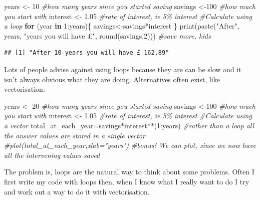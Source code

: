 \documentclass[
]{book}
\newenvironment{Shaded}{\begin{snugshade}}{\end{snugshade}}
\newcommand{\CommentTok}[1]{\textcolor[rgb]{0.56,0.35,0.01}{\textit{#1}}}
\newcommand{\ControlFlowTok}[1]{\textcolor[rgb]{0.13,0.29,0.53}{\textbf{#1}}}
\newcommand{\DecValTok}[1]{\textcolor[rgb]{0.00,0.00,0.81}{#1}}
\newcommand{\FloatTok}[1]{\textcolor[rgb]{0.00,0.00,0.81}{#1}}
\newcommand{\FunctionTok}[1]{\textcolor[rgb]{0.00,0.00,0.00}{#1}}
\newcommand{\NormalTok}[1]{#1}
\newcommand{\OtherTok}[1]{\textcolor[rgb]{0.56,0.35,0.01}{#1}}
\newcommand{\SpecialCharTok}[1]{\textcolor[rgb]{0.00,0.00,0.00}{#1}}
\newcommand{\StringTok}[1]{\textcolor[rgb]{0.31,0.60,0.02}{#1}}
\begin{document}
\begin{Shaded}
\begin{Highlighting}[]
\NormalTok{years }\OtherTok{\textless{}{-}} \DecValTok{10} \CommentTok{\#how many years since you started saving}
\NormalTok{savings }\OtherTok{\textless{}{-}}\DecValTok{100} \CommentTok{\#how much you start with}
\NormalTok{interest }\OtherTok{\textless{}{-}} \FloatTok{1.05} \CommentTok{\#rate of interest, ie 5\% interest}
\CommentTok{\#Calculate using a loop}
\ControlFlowTok{for}\NormalTok{ (year }\ControlFlowTok{in} \DecValTok{1}\SpecialCharTok{:}\NormalTok{years)\{}
\NormalTok{  savings}\OtherTok{\textless{}{-}}\NormalTok{savings}\SpecialCharTok{*}\NormalTok{interest}
\NormalTok{\}}
\FunctionTok{print}\NormalTok{(}\FunctionTok{paste}\NormalTok{(}\StringTok{"After"}\NormalTok{, years, }\StringTok{"years you will have £"}\NormalTok{, }\FunctionTok{round}\NormalTok{(savings,}\DecValTok{2}\NormalTok{))) }\CommentTok{\#save more, kids}
\end{Highlighting}
\end{Shaded}

\begin{verbatim}
## [1] "After 10 years you will have £ 162.89"
\end{verbatim}

Lots of people advise against using loops because they are can be slow and it isn't always obvious what they are doing. Alternatives often exist, like vectorisation:

\begin{Shaded}
\begin{Highlighting}[]
\NormalTok{years }\OtherTok{\textless{}{-}} \DecValTok{20} \CommentTok{\#how many years since you started saving}
\NormalTok{savings }\OtherTok{\textless{}{-}}\DecValTok{100} \CommentTok{\#how much you start with}
\NormalTok{interest }\OtherTok{\textless{}{-}} \FloatTok{1.05} \CommentTok{\#rate of interest, ie 5\% interest}
\CommentTok{\#Calculate using a vector}
\NormalTok{total\_at\_each\_year}\OtherTok{=}\NormalTok{savings}\SpecialCharTok{*}\NormalTok{interest}\SpecialCharTok{**}\NormalTok{(}\DecValTok{1}\SpecialCharTok{:}\NormalTok{years) }\CommentTok{\#rather than a loop all the answer values are stored in a single vector}
\CommentTok{\#plot(total\_at\_each\_year,xlab="years") \#bonus! We can plot, since we now have all the intervening values saved}
\end{Highlighting}
\end{Shaded}

The problem is, loops are the natural way to think about some problems. Often I first write my code with loops then, when I know what I really want to do I try and work out a way to do it with vectorisation.
\end{document}
